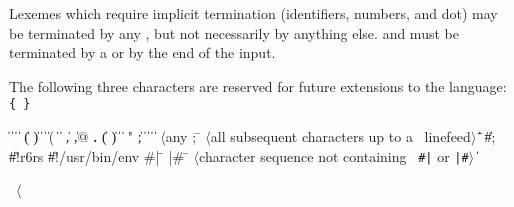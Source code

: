 \vest Lexemes which require implicit termination (identifiers, numbers,
and dot) may be terminated by any , but not
necessarily by anything else.   and 
must be terminated by a  or by the end of the input.

The following three characters are reserved for future extensions to the
language: {\tt \verb"{" \verb"}"}

\begin{grammar}%
 \:  \|  \| 
\>  \|  \| 
\>  \| ( \| ) \| \openbracket{} \| \closedbracket{} \| \sharpsign( \| \singlequote{} \| \backquote{} \| , \| ,@ \| {\bf.}
 \:  \| ( \| ) \| \openbracket{} \| \closedbracket{} " \| ;
 \:  \| 
\> \|  \|  
\> \| 
 \: $\langle${\rm any }
\> 
 \: ; \= $\langle$\rm all subsequent characters up to a
		    \>\ \rm linefeed$\rangle$
\qquad \= \| 
\> \| \#; 
\> \| \#!r6rs \| \#!/usr/bin/env
 \: \#| \= 
\>  |\#
 \: \= $\langle$\rm character sequence not containing
\>\ \rm {\tt \#|} or {\tt |\#}$\rangle$
 \:  
 \:  \| 
 \: %
\end{grammar}

\label{extendedalphas}
\label{identifiersyntax}

\hbox{\cf{} \goesto{} $\langle$}

